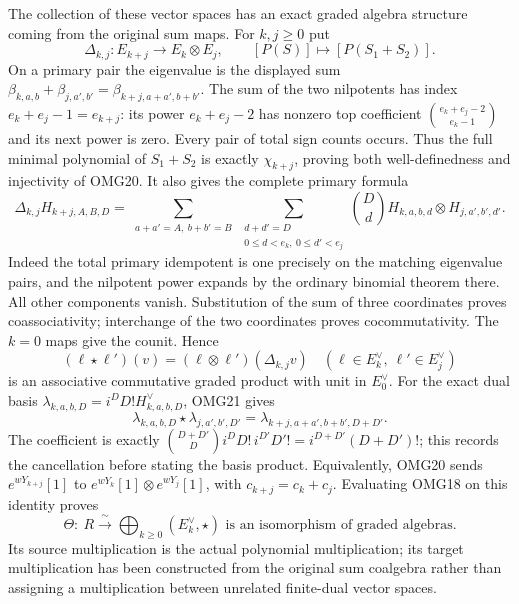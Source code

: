 \documentclass[11pt,a4paper]{article}
\begin{document}
The collection of these vector spaces has an exact graded algebra
structure coming from the original sum maps. For $k,j\ge0$ put
\[
 \Delta_{k,j}:E_{k+j}\longrightarrow E_k\otimes E_j,
               \qquad[P(S)]\longmapsto[P(S_1+S_2)].
 \tag{OMG20}
\]
On a primary pair the eigenvalue is the displayed sum
$\beta_{k,a,b}+\beta_{j,a',b'}=\beta_{k+j,a+a',b+b'}$.
The sum of the two nilpotents has index $e_k+e_j-1=e_{k+j}$:
its power $e_k+e_j-2$ has nonzero top coefficient
$\binom{e_k+e_j-2}{e_k-1}$ and its next power is zero. Every
pair of total sign counts occurs. Thus the full minimal polynomial
of $S_1+S_2$ is exactly $\chi_{k+j}$, proving both well-definedness
and injectivity of OMG20. It also gives the complete primary formula
\[
 \Delta_{k,j}H_{k+j,A,B,D}
 =\sum_{\substack{a+a'=A,\ b+b'=B}}
   \sum_{\substack{d+d'=D\\0\le d<e_k,\ 0\le d'<e_j}}
       \binom Dd H_{k,a,b,d}\otimes H_{j,a',b',d'}.
 \tag{OMG21}
\]
Indeed the total primary idempotent is one precisely on the
matching eigenvalue pairs, and the nilpotent power expands by the
ordinary binomial theorem there. All other components vanish.
Substitution of the sum of three coordinates proves coassociativity;
interchange of the two coordinates proves cocommutativity. The
$k=0$ maps give the counit. Hence
\[
 (\ell\star\ell')(v)=(\ell\otimes\ell')(\Delta_{k,j}v)
       \quad(\ell\in E_k^\vee,\ \ell'\in E_j^\vee)
 \tag{OMG22}
\]
is an associative commutative graded product with unit in $E_0^\vee$.
For the exact dual basis $\lambda_{k,a,b,D}=i^DD!H_{k,a,b,D}^\vee$,
OMG21 gives
\[
 \lambda_{k,a,b,D}\star\lambda_{j,a',b',D'}
       =\lambda_{k+j,a+a',b+b',D+D'}.
\]
The coefficient is exactly
$\binom{D+D'}D i^DD!\,i^{D'}D'!=i^{D+D'}(D+D')!$;
this records the cancellation before stating the basis product.
Equivalently, OMG20 sends $e^{wY_{k+j}}[1]$ to
$e^{wY_k}[1]\otimes e^{wY_j}[1]$, with
$c_{k+j}=c_k+c_j$. Evaluating OMG18 on this identity proves
\[
 \boxed{\Theta:\ R\xrightarrow{\ \sim\ }
                    \bigoplus_{k\ge0}(E_k^\vee,\star)
                  \text{ is an isomorphism of graded algebras}.}
 \tag{OMG23}
\]
Its source multiplication is the actual polynomial multiplication;
its target multiplication has been constructed from the original sum
coalgebra rather than assigning a multiplication between unrelated
finite-dual vector spaces.
\end{document}
